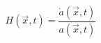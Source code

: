 \begin{equation}                                             \label{0}
H(\vec{x},t)=\frac{\dot{a}(\vec{x},t)}{a(\vec{x},t)}
\end{equation}

